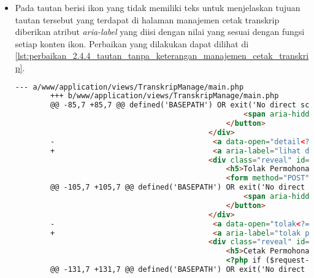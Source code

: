 \begin{itemize}
    \item Pada tautan berisi ikon yang tidak memiliki teks untuk menjelaskan tujuan tautan tersebut yang terdapat di halaman manajemen cetak transkrip diberikan atribut \textit{aria-label} yang diisi dengan nilai yang sesuai dengan fungsi setiap konten ikon. Perbaikan yang dilakukan dapat dilihat di \ref{lst:perbaikan_2.4.4_tautan_tanpa_keterangan_manajemen_cetak_transkrip}.
    \begin{lstlisting}[frame=single, label={lst:perbaikan_2.4.4_tautan_tanpa_keterangan_manajemen_cetak_transkrip}, language=HTML, caption=Perbaikan Kriteria Sukses 2.4.4 - Tautan Tanpa Keterangan di Halaman Manajemen Cetak Transkrip]
        --- a/www/application/views/TranskripManage/main.php
        +++ b/www/application/views/TranskripManage/main.php
        @@ -85,7 +85,7 @@ defined('BASEPATH') OR exit('No direct script access allowed');
                                                    <span aria-hidden="true">&times;</span>
                                                </button>                                        
                                            </div>
        -                                    <a data-open="detail<?= $request->id ?>"><i class="fi-eye"></i></a>
        +                                    <a aria-label="lihat detail permohonan" data-open="detail<?= $request->id ?>"><i class="fi-eye"></i></a>
                                            <div class="reveal" id="tolak<?= $request->id ?>" data-reveal>
                                                <h5>Tolak Permohonan</h5>
                                                <form method="POST" action="/TranskripManage/answer">
        @@ -105,7 +105,7 @@ defined('BASEPATH') OR exit('No direct script access allowed');
                                                    <span aria-hidden="true">&times;</span>
                                                </button>
                                            </div>
        -                                    <a data-open="tolak<?= $request->id ?>"><i class="fi-dislike"></i></a>
        +                                    <a aria-label="tolak permohonan" data-open="tolak<?= $request->id ?>"><i class="fi-dislike"></i></a>
                                            <div class="reveal" id="cetak<?= $request->id ?>" data-reveal>
                                                <h5>Cetak Permohonan</h5>
                                                <?php if ($request->requestByNPM !== NULL): ?>
        @@ -131,7 +131,7 @@ defined('BASEPATH') OR exit('No direct script access allowed');

\end{lstlisting}
\end{itemize}
